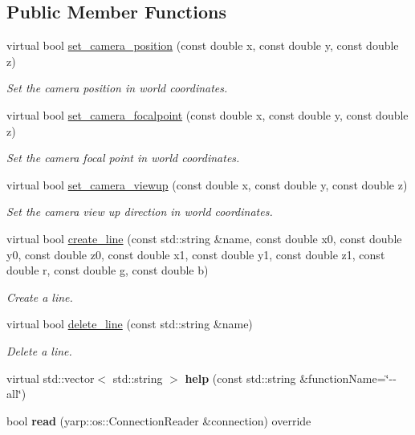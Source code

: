 \subsection*{Public Member Functions}
\begin{DoxyCompactItemize}
\item 
virtual bool \hyperlink{classskeletonViewer__IDL_afdff1c47b3874a112c5fe601b2b9fac6}{set\+\_\+camera\+\_\+position} (const double x, const double y, const double z)
\begin{DoxyCompactList}\small\item\em Set the camera position in world coordinates. \end{DoxyCompactList}\item 
virtual bool \hyperlink{classskeletonViewer__IDL_a6b603079ea6fd21663de28091b9a1719}{set\+\_\+camera\+\_\+focalpoint} (const double x, const double y, const double z)
\begin{DoxyCompactList}\small\item\em Set the camera focal point in world coordinates. \end{DoxyCompactList}\item 
virtual bool \hyperlink{classskeletonViewer__IDL_addc168b73a8279fa6c146e4a7365cd77}{set\+\_\+camera\+\_\+viewup} (const double x, const double y, const double z)
\begin{DoxyCompactList}\small\item\em Set the camera view up direction in world coordinates. \end{DoxyCompactList}\item 
virtual bool \hyperlink{classskeletonViewer__IDL_ae893be656a21bfd75682fd4efb20a2d8}{create\+\_\+line} (const std\+::string \&name, const double x0, const double y0, const double z0, const double x1, const double y1, const double z1, const double r, const double g, const double b)
\begin{DoxyCompactList}\small\item\em Create a line. \end{DoxyCompactList}\item 
virtual bool \hyperlink{classskeletonViewer__IDL_a3a1f90f10689c4411e522d41d5d19908}{delete\+\_\+line} (const std\+::string \&name)
\begin{DoxyCompactList}\small\item\em Delete a line. \end{DoxyCompactList}\item 
\mbox{\label{classskeletonViewer__IDL_a970ce92704e75f8f8a4e663aace17436}} 
virtual std\+::vector$<$ std\+::string $>$ {\bfseries help} (const std\+::string \&function\+Name=\char`\"{}-\/-\/all\char`\"{})
\item 
\mbox{\label{classskeletonViewer__IDL_ae6e019ed8b536029c204defd60c7d63b}} 
bool {\bfseries read} (yarp\+::os\+::\+Connection\+Reader \&connection) override
\end{DoxyCompactItemize}


